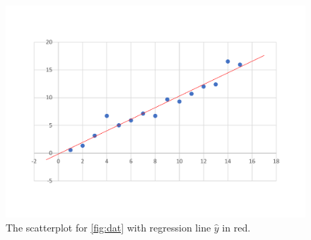 \documentclass[10pt,a4paper, twocolumn, conference]{IEEEtran}
\begin{document}
\begin{figure}[H]
\centering
\includegraphics[width = 1.0\textwidth]{data_graphmain}
\caption{The scatterplot for \cref{fig:dat} with regression line $\hat{y}$ in red.}
\label{fig:main}
\end{figure}
\end{document}
